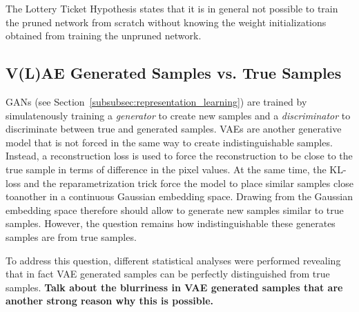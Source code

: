 The Lottery Ticket Hypothesis states that it is in general not possible to train the pruned network from scratch without knowing the weight initializations obtained from training the unpruned network.

\subsection{V(L)AE Generated Samples vs. True Samples}\label{subsec:vae-generated-samples-vs-true-samples}
\acp{GAN} (see Section~\ref{subsubsec:representation_learning}) are trained by simulatenously training a \textit{generator} to create new samples and a \textit{discriminator} to discriminate between true and generated samples.
\acp{VAE} are another generative model that is not forced in the same way to create indistinguishable samples.
Instead, a reconstruction loss is used to force the reconstruction to be close to the true sample in terms of difference in the pixel values.
At the same time, the \ac{KL}-loss and the reparametrization trick force the model to place similar samples close toanother in a continuous Gaussian embedding space.
Drawing from the Gaussian embedding space therefore should allow to generate new samples similar to true samples.
However, the question remains how indistinguishable these generates samples are from true samples.

To address this question, different statistical analyses were performed revealing that in fact VAE generated samples can be perfectly distinguished from true samples.
\textbf{Talk about the blurriness in VAE generated samples that are another strong reason why this is possible.}

